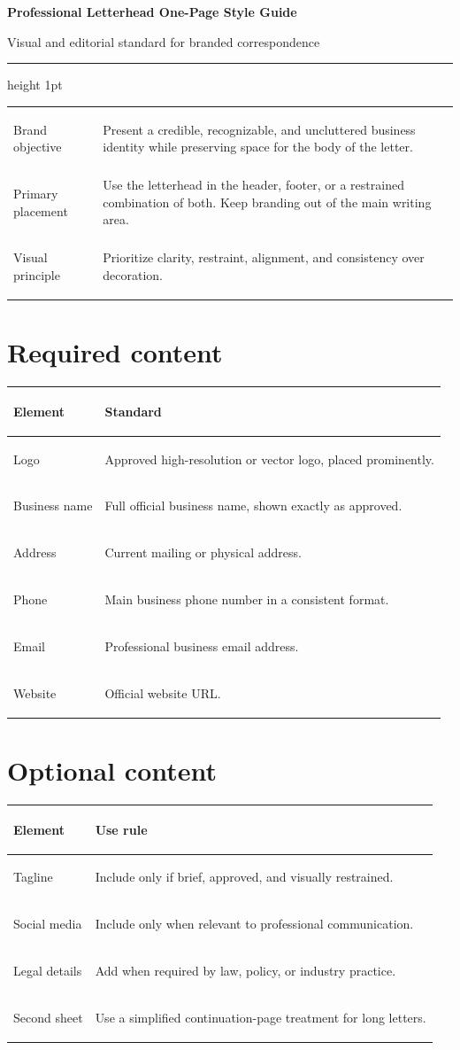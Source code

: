 \documentclass[10pt]{article}
\begin{document}
\small

{\Large\bfseries Professional Letterhead One-Page Style Guide}\par
{\normalsize Visual and editorial standard for branded correspondence}\par
\vspace{0.35em}
\hrule height 1pt
\vspace{0.45em}

\begin{tabularx}{\textwidth}{>{\bfseries\raggedright\arraybackslash}p{} X}
Brand objective & Present a credible, recognizable, and uncluttered business identity while preserving space for the body of the letter. \\
Primary placement & Use the letterhead in the header, footer, or a restrained combination of both. Keep branding out of the main writing area. \\
Visual principle & Prioritize clarity, restraint, alignment, and consistency over decoration. \\
\end{tabularx}

\section*{Required content}
\begin{tabularx}{\textwidth}{>{\bfseries\raggedright\arraybackslash}p{} X}
\toprule
Element & Standard \\
\midrule
Logo & Approved high-resolution or vector logo, placed prominently. \\
Business name & Full official business name, shown exactly as approved. \\
Address & Current mailing or physical address. \\
Phone & Main business phone number in a consistent format. \\
Email & Professional business email address. \\
Website & Official website URL. \\
\bottomrule
\end{tabularx}

\section*{Optional content}
\begin{tabularx}{\textwidth}{>{\bfseries\raggedright\arraybackslash}p{} X}
\toprule
Element & Use rule \\
\midrule
Tagline & Include only if brief, approved, and visually restrained. \\
Social media & Include only when relevant to professional communication. \\
Legal details & Add when required by law, policy, or industry practice. \\
Second sheet & Use a simplified continuation-page treatment for long letters. \\
\bottomrule
\end{tabularx}
\end{document}
